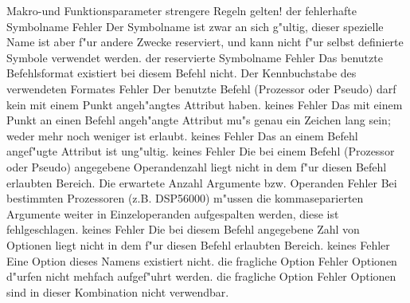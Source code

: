 \documentclass[12pt,a4paper,twoside]{report}
\begin{document}
\begin{description}
{                Makro-und Funktionsparameter strengere Regeln gelten!}
               {der fehlerhafte Symbolname}
               {Fehler}
               {Der Symbolname ist zwar an sich g"ultig, dieser spezielle
                Name ist aber f"ur andere Zwecke reserviert, und kann nicht
                f"ur selbst definierte Symbole verwendet werden.}
               {der reservierte Symbolname}
               {Fehler}
               {Das benutzte Befehlsformat existiert bei diesem
                Befehl nicht.}
               {Der Kennbuchstabe des verwendeten Formates}
               {Fehler}
               {Der benutzte Befehl (Prozessor oder Pseudo) darf
                kein mit einem Punkt angeh"angtes Attribut haben.}
               {keines}
               {Fehler}
               {Das mit einem Punkt an einen Befehl angeh"angte
                Attribut mu"s genau ein Zeichen lang sein; weder mehr noch
                weniger ist erlaubt.}
               {keines}
               {Fehler}
               {Das an einem Befehl angef"ugte Attribut ist ung"ultig.}
               {keines}
               {Fehler}
               {Die bei einem Befehl (Prozessor oder Pseudo)
                angegebene Operandenzahl liegt nicht in dem f"ur diesen
                Befehl erlaubten Bereich.}
               {Die erwartete Anzahl Argumente bzw. Operanden}
               {Fehler}
               {Bei bestimmten Prozessoren (z.B. DSP56000)
                m"ussen die kommaseparierten Argumente weiter in
                Einzeloperanden aufgespalten werden, diese ist
                fehlgeschlagen.}
               {keines}
               {Fehler}
               {Die bei diesem Befehl angegebene Zahl
	        von Optionen liegt nicht in dem f"ur diesen
                Befehl erlaubten Bereich.}
               {keines}
               {Fehler}
               {Eine Option dieses Namens existiert nicht.}
               {die fragliche Option}
               {Fehler}
               {Optionen d"urfen nicht mehfach aufgef"uhrt werden.}
               {die fragliche Option}
               {Fehler}
               {Optionen sind in dieser Kombination nicht verwendbar.}

\end{description}
\end{document}
